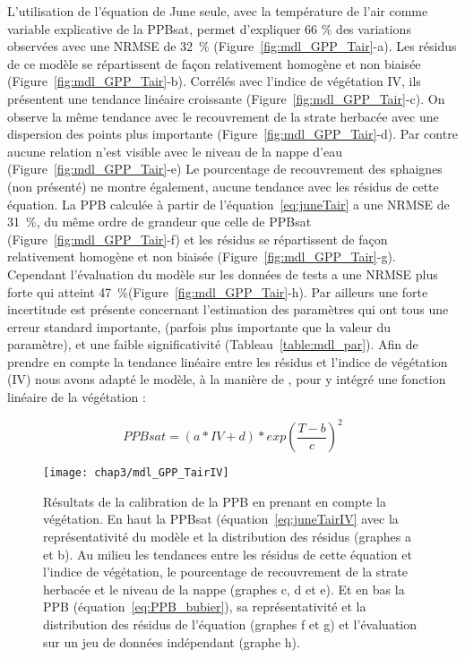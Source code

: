 L'utilisation de l'équation de June seule, avec la température de l'air comme variable explicative de la PPBsat, permet d'expliquer 66 \% des variations observées avec une NRMSE de \SI{32}{\percent} (Figure~\ref{fig:mdl_GPP_Tair}-a).
Les résidus de ce modèle se répartissent de façon relativement homogène et non biaisée (Figure~\ref{fig:mdl_GPP_Tair}-b).
Corrélés avec l'indice de végétation IV, ils présentent une tendance linéaire croissante (Figure~\ref{fig:mdl_GPP_Tair}-c).
On observe la même tendance avec le recouvrement de la strate herbacée avec une dispersion des points plus importante (Figure~\ref{fig:mdl_GPP_Tair}-d).
Par contre aucune relation n'est visible avec le niveau de la nappe d'eau (Figure~\ref{fig:mdl_GPP_Tair}-e)
Le pourcentage de recouvrement des sphaignes (non présenté) ne montre également, aucune tendance avec les résidus de cette équation.
La PPB calculée à partir de l'équation~\ref{eq:juneTair} a une NRMSE de \SI{31}{\percent}, du même ordre de grandeur que celle de PPBsat (Figure~\ref{fig:mdl_GPP_Tair}-f) et les résidus se répartissent de façon relativement homogène et non biaisée (Figure~\ref{fig:mdl_GPP_Tair}-g).
Cependant l'évaluation du modèle sur les données de tests a une NRMSE plus forte qui atteint \SI{47}{\percent}(Figure~\ref{fig:mdl_GPP_Tair}-h).
Par ailleurs une forte incertitude est présente concernant l'estimation des paramètres qui ont tous une erreur standard importante, (parfois plus importante que la valeur du paramètre), et une faible significativité (Tableau~\ref{table:mdl_par}).
Afin de prendre en compte la tendance linéaire entre les résidus et l'indice de végétation (IV) nous avons adapté le modèle, à la manière de \citet{bortoluzzi2006a}, pour y intégré une fonction linéaire de la végétation :

\begin{equation}\label{eq:juneTairIV}
PPBsat = (a * IV + d) * exp\left(\frac{T - b}{c}\right)^2
\end{equation}

\begin{figure} %
\centering
\texttt{[image: chap3/mdl\_GPP\_TairIV]}
\caption{Résultats de la calibration de la PPB en prenant en compte la végétation. En haut la PPBsat (équation~\ref{eq:juneTairIV} avec la représentativité du modèle et la distribution des résidus (graphes a et b). Au milieu les tendances entre les résidus de cette équation et l'indice de végétation, le pourcentage de recouvrement de la strate herbacée et le niveau de la nappe (graphes c, d et e). Et en bas la PPB (équation~\ref{eq:PPB_bubier}), sa représentativité et la distribution des résidus de l'équation (graphes f et g) et l'évaluation sur un jeu de données indépendant (graphe h).}
\label{fig:mdl_GPP_TairIV}
\end{figure}

